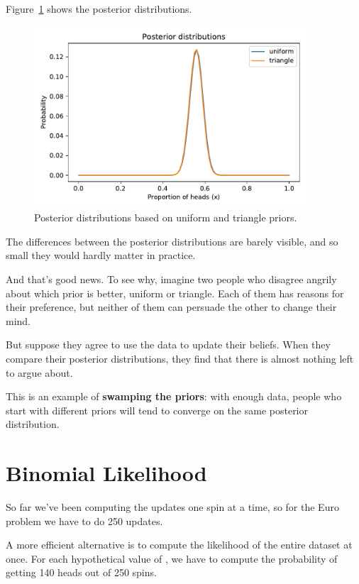 \documentclass[12pt]{book}
\theoremstyle{exercise}
\begin{document}
Figure~\ref{fig03-04} shows the posterior distributions.

\begin{figure}
\centerline{\includegraphics[width=4in]{figs/fig03-04.pdf}}
\caption{Posterior distributions based on uniform and triangle priors.}
\label{fig03-04}
\end{figure}

The differences between the posterior distributions are barely visible, and so small they would hardly matter in practice.

And that's good news.
To see why, imagine two people who disagree angrily about which prior is better, uniform or triangle.
Each of them has reasons for their preference, but neither of them can persuade the other to change their mind.

But suppose they agree to use the data to update their beliefs.
When they compare their posterior distributions, they find that there is almost nothing left to argue about.

This is an example of {\bf swamping the priors}: with enough
data, people who start with different priors will tend to
converge on the same posterior distribution.



\section{Binomial Likelihood}
\label{binomlike}

So far we've been computing the updates one spin at a time, so for the Euro problem we have to do 250 updates.

A more efficient alternative is to compute the likelihood of the entire dataset at once.
For each hypothetical value of , we have to compute the probability of getting 140 heads out of 250 spins.
\end{document}
